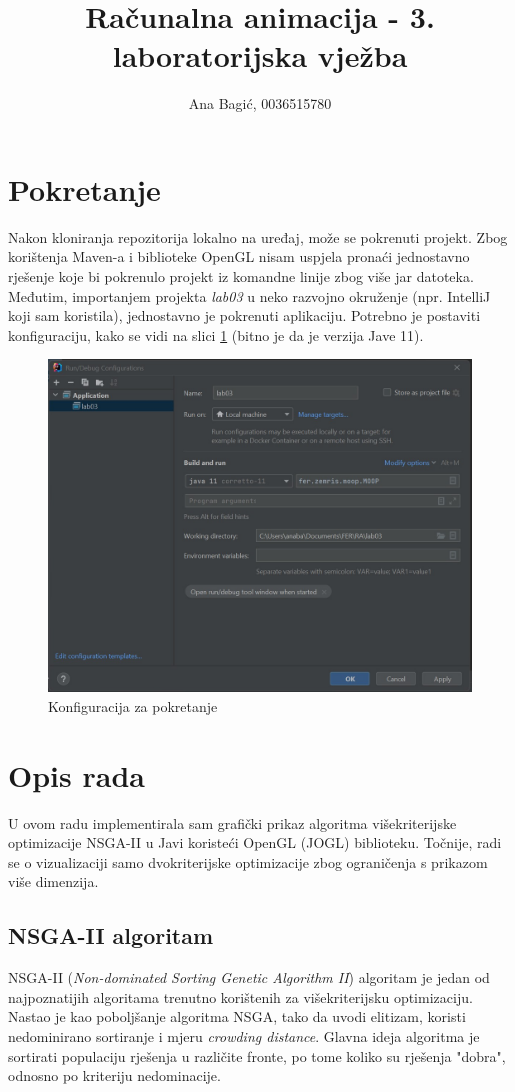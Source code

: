 \documentclass[]{article}
\title{Računalna animacija - 3. laboratorijska vježba}
\author{Ana Bagić, 0036515780}
\begin{document}
\maketitle
\section{Pokretanje}

Nakon kloniranja repozitorija lokalno na uređaj, može se pokrenuti projekt. Zbog korištenja Maven-a i biblioteke OpenGL nisam uspjela pronaći jednostavno rješenje koje bi pokrenulo projekt iz komandne linije zbog više jar datoteka. Međutim, importanjem projekta \textit{lab03} u neko razvojno okruženje (npr. IntelliJ koji sam koristila), jednostavno je pokrenuti aplikaciju. Potrebno je postaviti konfiguraciju, kako se vidi na slici \ref{fig:config} (bitno je da je verzija Jave 11).
\begin{figure}[h]
	\includegraphics[scale=0.7]{config.jpg}
	\centering
	\caption{Konfiguracija za pokretanje}
	\label{fig:config}
\end{figure}
\pagebreak

\section{Opis rada}
U ovom radu implementirala sam grafički prikaz algoritma višekriterijske optimizacije NSGA-II u Javi koristeći OpenGL (JOGL) biblioteku. Točnije, radi se o vizualizaciji samo dvokriterijske optimizacije zbog ograničenja s prikazom više dimenzija.

\subsection{NSGA-II algoritam}
NSGA-II (\textit{Non-dominated Sorting Genetic Algorithm II}) algoritam je jedan od najpoznatijih algoritama trenutno korištenih za višekriterijsku optimizaciju. Nastao je kao poboljšanje algoritma NSGA, tako da uvodi elitizam, koristi nedominirano sortiranje i mjeru \textit{crowding distance}. Glavna ideja algoritma je sortirati populaciju rješenja u različite fronte, po tome koliko su rješenja "dobra", odnosno po kriteriju nedominacije.\\
\end{document}
